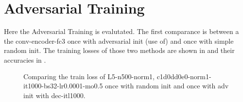
\section{Adversarial Training}\label{sec:exp_adv}
\thesisStateNotReady
Here the Adversarial Training is evalutated.
The first comparance is between a the conv-encoder-fc3 once with adversarial init (use of) and once with simple random init.
The training losses of those two methods are shown in  and their accuracies in .

\begin{figure}[!ht]
  \centering
  \caption{Comparing the train loss of L5-n500-norm1, c1d0dd0e0-norm1-it1000-bs32-lr0.0001-mo0.5 once with random init and once with adv init with dec-itl1000.}
  \label{fig:exp_adv_fc3_train_loss}
\end{figure}
\FloatBarrier
\noindent

